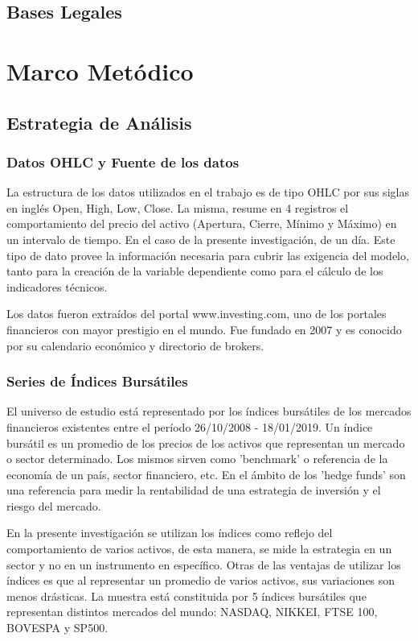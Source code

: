 \documentclass[a4paper,12pt]{Latex/Classes/PhDthesisPSnPDF}
\begin{document}
\section{Bases Legales}



\chapter{Marco Metódico}
\section{Estrategia de Análisis}

\subsection{Datos OHLC y Fuente de los datos}

La estructura de los datos utilizados en el trabajo es de tipo OHLC por sus siglas en inglés Open, High, Low, Close. La misma, resume en 4 registros el comportamiento del precio del activo (Apertura, Cierre, Mínimo y Máximo) en un intervalo de tiempo. En el caso de la presente investigación, de un día. Este tipo de dato provee la información necesaria para cubrir las exigencia del modelo, tanto para la creación de la variable dependiente como para el cálculo de los indicadores técnicos.

Los datos fueron extraídos del portal www.investing.com, uno de los portales financieros con mayor prestigio en el mundo. Fue fundado en 2007 y es conocido por su calendario económico y directorio de brokers.

\subsection{Series de Índices Bursátiles}

El universo de estudio está representado por los índices bursátiles de los mercados financieros existentes entre el período 26/10/2008 - 18/01/2019. Un índice bursátil es un promedio de los precios de los activos que representan un mercado o sector determinado. Los mismos sirven como 'benchmark' o referencia de la economía de un país, sector financiero, etc. En el ámbito de los 'hedge funds' son una referencia para medir la rentabilidad de una estrategia de inversión y el riesgo del mercado.

En la presente investigación se utilizan los índices como reflejo del comportamiento de varios activos, de esta manera, se mide la estrategia en un sector y no en un instrumento en específico. Otras de las ventajas de utilizar los índices es que al representar un promedio de varios activos, sus variaciones son menos drásticas. La muestra está constituida por 5 índices bursátiles que representan distintos mercados del mundo: NASDAQ, NIKKEI, FTSE 100, BOVESPA y SP500.
\end{document}
